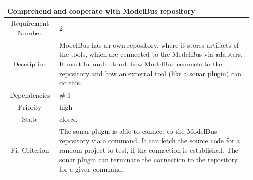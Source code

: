 \begin{table}[H]
\begin{tabular}{|c|p{10cm}|}
\hline 
\multicolumn{2}{|l|}{\textbf{Comprehend and cooperate with ModelBus repository}} \\ 
\hline 
Requirement Number & 2 \\ \hline 
Description & ModelBus has an own repository, where it stores artifacts of the tools, which are connected to the ModelBus via adapters. It must be understood, how ModelBus connects to the repository and how an external tool (like a sonar plugin) can do this. \\ \hline 
Dependencies & \# 1 \\ \hline 
Priority & high \\ \hline 
State & closed \\ \hline 
Fit Criterion & The sonar plugin is able to connect to the ModelBus repository via a command. It can fetch the source code for a random project to test, if the connection is established. The sonar plugin can terminate the connection to the repository for a given command. \\ \hline 
\end{tabular}
\end{table}

